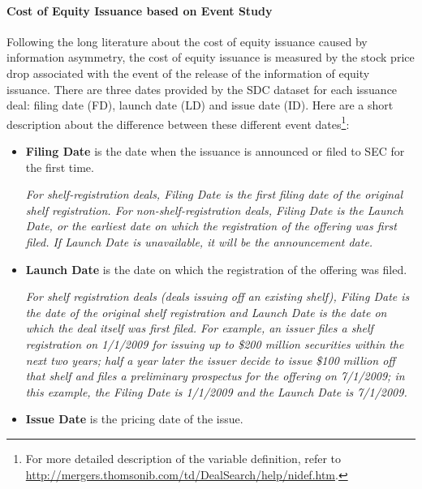 \documentclass[11pt]{article}
\begin{document}
\paragraph{Cost of Equity Issuance based on Event Study} Following the long literature about the cost of equity issuance caused by information asymmetry, the cost of equity issuance is measured by the stock price drop associated with the event of the release of the information of equity issuance. There are three dates provided by the SDC dataset for each issuance deal: filing date (FD), launch date (LD) and issue date (ID). Here are a short description about the difference between these different event dates\footnote{For more detailed description of the variable definition, refer to \url{http://mergers.thomsonib.com/td/DealSearch/help/nidef.htm}.}: 
\begin{itemize}
	\item \textbf{Filing Date} is the date when the issuance is announced or filed to SEC for the first time.
	
	\textit{ For shelf-registration deals, Filing Date is the first filing date of the original shelf registration. For non-shelf-registration deals, Filing Date is the Launch Date, or the earliest date on which the registration of the offering was first filed. If Launch Date is unavailable, it will be the announcement date.}
	\item \textbf{Launch Date} is the date on which the registration of the offering was filed.
	
	\textit{For shelf registration deals (deals issuing off an existing shelf), Filing Date is the date of the original shelf registration and Launch Date is the date on which the deal itself was first filed. For example, an issuer files a shelf registration on 1/1/2009 for issuing up to \$200 million securities within the next two years; half a year later the issuer decide to issue \$100 million off that shelf and files a preliminary prospectus for the offering on 7/1/2009; in this example, the Filing Date is 1/1/2009 and the Launch Date is 7/1/2009.}
	\item \textbf{Issue Date} is the pricing date of the issue.
\end{itemize}
\end{document}
